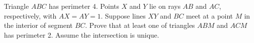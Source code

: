 Triangle $ABC$ has perimeter 4. Points $X$ and $Y$ lie on rays $AB$ and $AC$, respectively, with $AX=AY=1$. Suppose lines $XY$ and $BC$ meet at a point $M$ in the interior of segment $BC$. Prove that at least one of triangles $ABM$ and $ACM$ has perimeter 2. Assume the intersection is unique.
